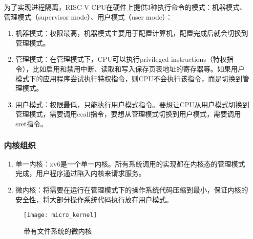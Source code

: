 为了实现进程隔离，RISC-V CPU在硬件上提供3种执行命令的模式：机器模式、管理模式（supervisor mode）、用户模式（user mode）：

\begin{enumerate}
	\item 机器模式：权限最高，机器模式主要用于配置计算机，配置完成后就会切换到管理模式。
	\item 管理模式：在管理模式下，CPU可以执行privileged instructions（特权指令），比如启用和禁用中断、读取和写入保存页表地址的寄存器等。如果用户模式下的应用程序尝试执行特权指令，则CPU不会执行该指令，而是切换到管理模式。
	\item 用户模式：权限最低，只能执行用户模式指令。要想让CPU从用户模式切换到管理模式，需要调用ecall指令，要想从管理模式切换到用户模式，需要调用sret指令。
\end{enumerate}

\subsubsection{内核组织}

\begin{enumerate}
	\item 单一内核：xv6是一个单一内核。所有系统调用的实现都在内核态的管理模式完成，用户程序通过陷入内核来请求服务。
	\item 微内核：将需要在运行在管理模式下的操作系统代码压缩到最小，保证内核的安全性，将大部分操作系统代码执行放在用户模式。
\end{enumerate}

\begin{figure}[!htb]
	\centering
	\texttt{[image: micro\_kernel]}
	\caption{带有文件系统的微内核}
	\label{fig:micro_kernel}
\end{figure}

